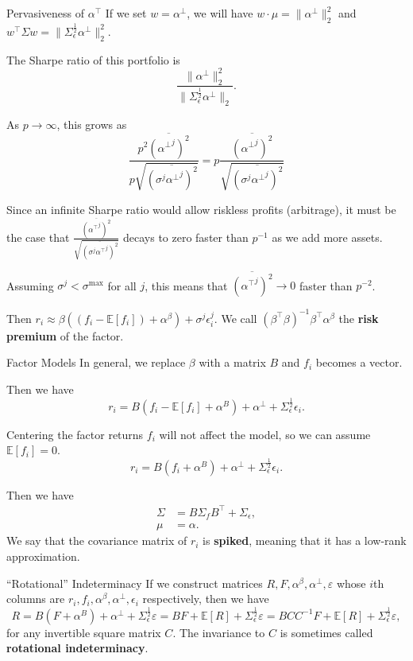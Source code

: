 \documentclass{beamer}
\begin{document}
\begin{frame}{Pervasiveness of $\alpha^\top$}
	If we set $w = \alpha^\bot$, we will have $w\cdot\mu = \|\alpha^\bot\|_2^2$ and $w^\top\Sigma w = \|\Sigma_\epsilon^\frac{1}{2} \alpha^\bot\|_2^2$.

	The Sharpe ratio of this portfolio is
	$$\frac{\|\alpha^\bot\|_2^2}{\|\Sigma_\epsilon^\frac{1}{2}\alpha^\bot\|_2}.$$

	As $p\to\infty$, this grows as
	$$\frac{p^2 \overline{({\alpha^\bot}^j)^2}}{p \sqrt{\overline{(\sigma^j {\alpha^\bot}^j)^2}}} = p \frac{\overline{({\alpha^\bot}^j)^2}}{\sqrt{\overline{(\sigma^j {\alpha^\bot}^j)^2}}} $$

	Since an infinite Sharpe ratio would allow riskless profits (arbitrage), it must be the case that $\frac{\overline{({\alpha^\top}^j)^2}}{\sqrt{\overline{(\sigma^j{\alpha^\top}^j)^2}}}$ decays to zero faster than $p^{-1}$ as we add more assets.

	Assuming $\sigma^j<\sigma^{\max}$ for all $j$, this means that $\overline{({\alpha^\top}^j)^2}\to 0$ faster than $p^{-2}$.

	Then $r_i \approx \beta ((f_i-\mathbb{E}[f_i]) + \alpha^\beta) + \sigma^j\epsilon_i^j$. We call $(\beta^\top \beta)^{-1}\beta^\top\alpha^\beta$ the \textbf{risk premium} of the factor.

\end{frame}

\begin{frame}{Factor Models}
	In general, we replace $\beta$ with a matrix $B$ and $f_i$ becomes a vector.

	Then we have
	$$r_i = B(f_i-\mathbb{E}[f_i] + \alpha^B) + \alpha^\bot + \Sigma_\epsilon^\frac{1}{2}\epsilon_i.$$

	Centering the factor returns $f_i$ will not affect the model, so we can assume $\mathbb{E}[f_i]=0$.
	$$r_i = B(f_i + \alpha^B) + \alpha^\bot + \Sigma_\epsilon^\frac{1}{2}\epsilon_i.$$

	Then we have
	\begin{align*}
		\Sigma	&= B \Sigma_f B^\top + \Sigma_\epsilon,
	\\	\mu	&= \alpha.
	\end{align*}
	We say that the covariance matrix of $r_i$ is \textbf{spiked}, meaning that it has a low-rank approximation.
\end{frame}

\begin{frame}{``Rotational'' Indeterminacy}
	If we construct matrices $R,F,\alpha^\beta,\alpha^\bot,\varepsilon$ whose $i$th columns are $r_i,f_i,\alpha^\beta,\alpha^\bot,\epsilon_i$ respectively, then we have
	$$R = B(F + \alpha^B) + \alpha^\bot + \Sigma_\epsilon^\frac{1}{2}\varepsilon = BF + \mathbb{E}[R] + \Sigma_\epsilon^\frac{1}{2}\varepsilon = BCC^{-1}F + \mathbb{E}[R] + \Sigma_\epsilon^\frac{1}{2}\varepsilon,$$
	for any invertible square matrix $C$. The invariance to $C$ is sometimes called \textbf{rotational indeterminacy}.
\end{frame}
\end{document}
